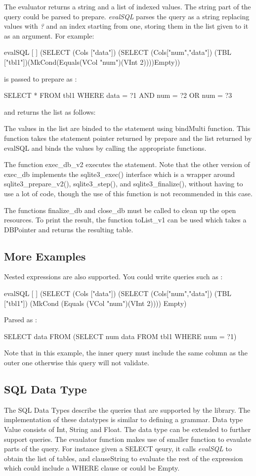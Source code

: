 \documentclass[11pt]{article}
\begin{document}
The evaluator returns a string and a list of indexed values.
The string part of the query could be parsed to prepare. 
\emph{evalSQL} parses the query as a string replacing values with \emph{?} and an index starting from one,
storing them in the list given to it as an argument.
For example:


evalSQL [ ] (SELECT (Cols ["data"]) (SELECT (Cols["num","data"]) (TBL ["tbl1"])(MkCond(Equals(VCol "num")(VInt 2))))Empty))

is passed to prepare as :

SELECT * FROM tbl1 WHERE data = ?1 AND num = ?2 OR num = ?3

and returns the list as follows:

The values in the list are binded to the statement using bindMulti function.
This function takes the statement pointer returned by prepare and the list returned by evalSQL
and binds the values by calling the appropriate functions.

The function exec\_db\_v2 executes the statement.
Note that the other version of exec\_db implements the sqlite3\_exec() interface which is a wrapper
around sqlite3\_prepare\_v2(), sqlite3\_step(), and sqlite3\_finalize(),
without having to use a lot of code, though the use of this function is not recommended in this case.

The functions finalize\_db and close\_db must be called to clean up the open resources.
To print the result, the function toList\_v1 can be used which takes a DBPointer and returns 
the resulting table.

\subsection{More Examples}
\label{More Examples}
Nested expressions are also supported. You could write queries such as :

evalSQL [ ] (SELECT (Cols ["data"]) (SELECT (Cols["num","data"]) (TBL ["tbl1"]) (MkCond (Equals (VCol "num")(VInt 2)))) Empty)

Parsed as :

SELECT data FROM (SELECT num data FROM tbl1 WHERE num = ?1)

Note that in this example, the inner query must include the same column as the outer one otherwise this query will not validate.

\subsection{SQL Data Type}
\label{SQL Data Type}
The SQL Data Types describe the queries that are supported by the library.
The implementation of these datatypes is similar to defining a grammar.
Data type Value consists of Int, String and Float.
The data type can be extended to further support queries.
The evaulator function makes use of smaller function to evaulate parts of the query.
For instance given a SELECT qeury, it calls \emph{evalSQL} to obtain the list of tables,
and clauseString to evaluate the rest of the expression which could include a WHERE clause or could be Empty.
\end{document}
